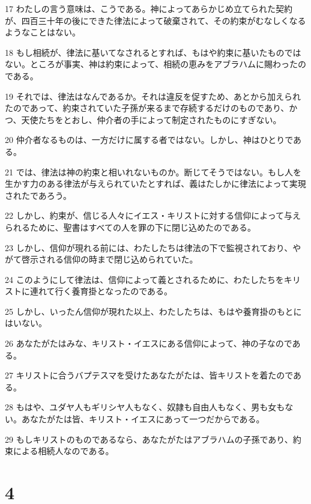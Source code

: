 \par 17 わたしの言う意味は、こうである。神によってあらかじめ立てられた契約が、四百三十年の後にできた律法によって破棄されて、その約束がむなしくなるようなことはない。
\par 18 もし相続が、律法に基いてなされるとすれば、もはや約束に基いたものではない。ところが事実、神は約束によって、相続の恵みをアブラハムに賜わったのである。
\par 19 それでは、律法はなんであるか。それは違反を促すため、あとから加えられたのであって、約束されていた子孫が来るまで存続するだけのものであり、かつ、天使たちをとおし、仲介者の手によって制定されたものにすぎない。
\par 20 仲介者なるものは、一方だけに属する者ではない。しかし、神はひとりである。
\par 21 では、律法は神の約束と相いれないものか。断じてそうではない。もし人を生かす力のある律法が与えられていたとすれば、義はたしかに律法によって実現されたであろう。
\par 22 しかし、約束が、信じる人々にイエス・キリストに対する信仰によって与えられるために、聖書はすべての人を罪の下に閉じ込めたのである。
\par 23 しかし、信仰が現れる前には、わたしたちは律法の下で監視されており、やがて啓示される信仰の時まで閉じ込められていた。
\par 24 このようにして律法は、信仰によって義とされるために、わたしたちをキリストに連れて行く養育掛となったのである。
\par 25 しかし、いったん信仰が現れた以上、わたしたちは、もはや養育掛のもとにはいない。
\par 26 あなたがたはみな、キリスト・イエスにある信仰によって、神の子なのである。
\par 27 キリストに合うバプテスマを受けたあなたがたは、皆キリストを着たのである。
\par 28 もはや、ユダヤ人もギリシヤ人もなく、奴隷も自由人もなく、男も女もない。あなたがたは皆、キリスト・イエスにあって一つだからである。
\par 29 もしキリストのものであるなら、あなたがたはアブラハムの子孫であり、約束による相続人なのである。

\chapter{4}

